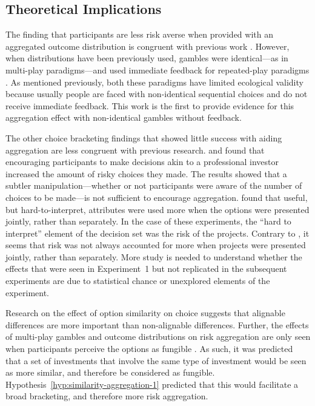 \documentclass[a4paper, nobind]{templates/ociamthesis}
\theoremstyle{definition}
\theoremstyle{definition}
\theoremstyle{definition}
\theoremstyle{definition}
\theoremstyle{remark}
\begin{document}
\subsection{Theoretical Implications}

The finding that participants are less risk averse when provided with an
aggregated outcome distribution is congruent with previous work \autocite[e.g.,][]{redelmeier1992}. However, when distributions have been previously used, gambles
were identical---as in multi-play paradigms---and used immediate feedback for
repeated-play paradigms \autocite[e.g.,][]{benartzi1999}. As mentioned previously, both
these paradigms have limited ecological validity because usually people are
faced with non-identical sequential choices and do not receive immediate
feedback. This work is the first to provide evidence for this aggregation effect
with non-identical gambles without feedback.

The other choice bracketing findings that showed little success with aiding
aggregation are less congruent with previous research. \textcite{sokolhessner2009} and
\textcite{sokolhessner2012} found that encouraging participants to make decisions akin to
a professional investor increased the amount of risky choices they made. The
results showed that a subtler manipulation---whether or not participants were
aware of the number of choices to be made---is not sufficient to encourage
aggregation. \textcite{hsee1999} found that useful, but hard-to-interpret, attributes were
used more when the options were presented jointly, rather than separately. In
the case of these experiments, the ``hard to interpret'' element of the decision
set was the risk of the projects. Contrary to \textcite{hsee1999}, it seems that risk was
not always accounted for more when projects were presented jointly, rather than
separately. More study is needed to understand whether the effects that were
seen in Experiment~1 but not replicated in the subsequent experiments are due to
statistical chance or unexplored elements of the experiment.

Research on the effect of option similarity on choice \autocite[e.g.,][]{markman1995}
suggests that alignable differences are more important than non-alignable
differences. Further, the effects of multi-play gambles and outcome
distributions on risk aggregation are only seen when participants perceive the
options as fungible \autocite[e.g.,][]{dekay2005}. As such, it was predicted that a set of
investments that involve the same type of investment would be seen as more
similar, and therefore be considered as fungible.
Hypothesis~\ref{hyp:similarity-aggregation-1} predicted that this would
facilitate a broad bracketing, and therefore more risk aggregation.
\end{document}
